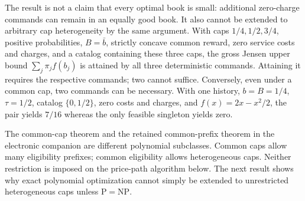 The result is not a claim that every optimal book is small: additional zero-charge commands can remain in an equally good book. It also cannot be extended to arbitrary cap heterogeneity by the same argument. With caps $1/4,1/2,3/4$, positive probabilities, $B=\bar b$, strictly concave common reward, zero service costs and charges, and a catalog containing these three caps, the gross Jensen upper bound $\sum_j\pi_jf(b_j)$ is attained by all three deterministic commands. Attaining it requires the respective commands; two cannot suffice. Conversely, even under a common cap, two commands can be necessary. With one history, $b=B=1/4$, $\tau=1/2$, catalog $\{0,1/2\}$, zero costs and charges, and $f(x)=2x-x^2/2$, the pair yields $7/16$ whereas the only feasible singleton yields zero.

The common-cap theorem and the retained common-prefix theorem in the electronic companion are different polynomial subclasses. Common caps allow many eligibility prefixes; common eligibility allows heterogeneous caps. Neither restriction is imposed on the price-path algorithm below. The next result shows why exact polynomial optimization cannot simply be extended to unrestricted heterogeneous caps unless $\mathrm P=\mathrm{NP}$.
